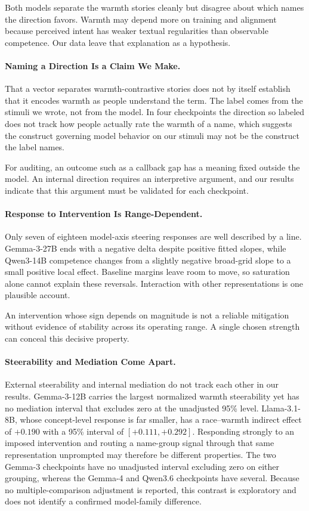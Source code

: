 \documentclass[twocolumn]{article}
\begin{document}
Both models separate the warmth stories cleanly but disagree about which
names the direction favors. Warmth may depend more on training and alignment
because perceived intent has weaker textual regularities than observable
competence. Our data leave that explanation as a hypothesis.

\paragraph{Naming a Direction Is a Claim We Make.}
That a vector separates warmth-contrastive stories does not by itself
establish that it encodes warmth as people understand the term. The label
comes from the stimuli we wrote, not from the model. In four checkpoints
the direction so labeled does not track how people actually rate the warmth
of a name, which suggests the construct governing model behavior on our
stimuli may not be the construct the label names.

For auditing, an outcome such as a callback gap has a meaning fixed outside
the model. An internal direction requires an interpretive argument, and our
results indicate that this argument must be validated for each checkpoint.

\paragraph{Response to Intervention Is Range-Dependent.}
Only seven of eighteen model-axis steering responses are well described by a
line. Gemma-3-27B ends with a negative delta despite positive fitted slopes,
while Qwen3-14B competence changes from a slightly negative broad-grid slope
to a small positive local effect. Baseline margins leave room to move, so
saturation alone cannot explain these reversals. Interaction with other
representations is one plausible account.

An intervention whose sign depends on magnitude is not a reliable mitigation
without evidence of stability across its operating range. A single chosen
strength can conceal this decisive property.

\paragraph{Steerability and Mediation Come Apart.}
External steerability and internal mediation do not track each other in our
results. Gemma-3-12B carries the largest normalized warmth steerability yet
has no mediation interval that excludes zero at the unadjusted 95\% level.
Llama-3.1-8B, whose concept-level response is far smaller, has a
race--warmth indirect effect of $+0.190$ with a 95\% interval of
$[+0.111, +0.292]$. Responding strongly to an imposed intervention and
routing a name-group signal through that same representation unprompted may
therefore be different properties. The two Gemma-3 checkpoints have no
unadjusted interval excluding zero on either grouping, whereas the Gemma-4
and Qwen3.6 checkpoints have several. Because no multiple-comparison
adjustment is reported, this contrast is exploratory and does not identify
a confirmed model-family difference.
\end{document}
